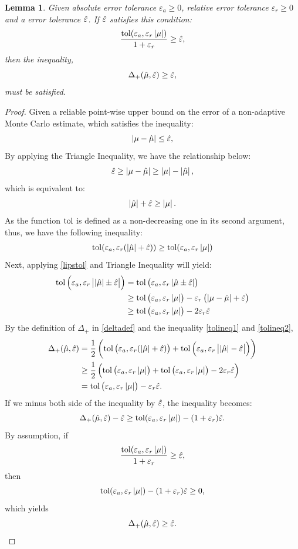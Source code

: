 \documentclass{iitthesis}
\newtheorem{lemma}[theorem]{Lemma}
\begin{document}
\begin{lemma}\label{cost2}
Given absolute error tolerance $\varepsilon_a \geq 0$, relative error tolerance $\varepsilon_r \geq 0$ and a error tolerance $\hat{\varepsilon}$. If $\hat{\varepsilon}$ satisfies this condition: $$\frac{\operatorname{tol}(\varepsilon_a, \varepsilon_r\left \lvert \mu \right \rvert)}{1+\varepsilon_r} \geq \hat{\varepsilon}, $$
then the inequality, $$\Delta_{+}(\hat{\mu},\hat{\varepsilon})\geq \hat{\varepsilon},$$ must be satisfied.
\end{lemma}
\begin{proof}
Given a reliable point-wise upper bound on the error of a non-adaptive Monte Carlo estimate, which satisfies the inequality: $$\left \lvert \mu -\hat{\mu} \right \rvert\leq \hat{\varepsilon},$$ By applying the Triangle Inequality, we have the relationship below:
$$\hat{\varepsilon} \geq \left \lvert \mu -\hat{\mu} \right \rvert\geq \left \lvert \mu \right \rvert-\left \lvert \hat{\mu} \right \rvert,$$ 
which is equivalent to: $$\left \lvert \hat{\mu} \right \rvert+\hat{\varepsilon} \geq \left \lvert \mu \right \rvert.$$
As the function $\operatorname{tol}$ is defined as a non-decreasing one in its second argument, thus, we have the following inequality:
\begin{align}\label{tolineq1}
\operatorname{tol}(\varepsilon_a, \varepsilon_r (\left \lvert \hat{\mu} \right \rvert+\hat{\varepsilon}))  \geq \operatorname{tol}(\varepsilon_a, \varepsilon_r \left \lvert \mu \right \rvert)
\end{align}
Next, applying \eqref{lipstol} and Triangle Inequality will yield:
\begin{align}
\operatorname{tol}\left(\varepsilon_a, \varepsilon_r \left \lvert \left \lvert \hat{\mu} \right \rvert\pm\hat{\varepsilon} \right \rvert\right)  &= \operatorname{tol}\left(\varepsilon_a, \varepsilon_r \left \lvert \hat{\mu} \pm\hat{\varepsilon} \right \rvert\right) \\& 
 \geq \operatorname{tol}\left(\varepsilon_a, \varepsilon_r \left \lvert \mu \right \rvert\right) - \varepsilon_r\left(\left \lvert \mu-\hat{\mu} \right \rvert+\hat{\varepsilon}\right) \\&
 \geq  \operatorname{tol}\left(\varepsilon_a, \varepsilon_r \left \lvert \mu \right \rvert\right) - 2\varepsilon_r\hat{\varepsilon} \label{tolineq2}
\end{align}
By the definition of $\Delta_{+}$ in \eqref{deltadef} and the inequality \eqref{tolineq1} and \eqref{tolineq2},
 \begin{align}
\Delta_{+}(\hat{\mu}, \hat{\varepsilon}) &= \frac{1}{2} \left ( \operatorname{tol}\left(\varepsilon_a, \varepsilon_r (\left \lvert \hat{\mu} \right \rvert+\hat{\varepsilon})\right) +\operatorname{tol}\left(\varepsilon_a, \varepsilon_r \left \lvert \left \lvert \hat{\mu} \right \rvert-\hat{\varepsilon} \right \rvert\right) \right) \\&
\geq \frac{1}{2} \left( \operatorname{tol}\left(\varepsilon_a,\varepsilon_r \left \lvert \mu \right \rvert\right) + \operatorname{tol}\left(\varepsilon_a, \varepsilon_r \left \lvert \mu \right \rvert\right) - 2\varepsilon_r\hat{\varepsilon} \right)\\& =  \operatorname{tol}\left(\varepsilon_a, \varepsilon_r \left \lvert \mu \right \rvert\right) - \varepsilon_r\hat{\varepsilon}.
\end{align}
If we minus both side of the inequality by $\hat{\varepsilon}$, the inequality becomes:
$$\Delta_{+}(\hat{\mu}, \hat{\varepsilon}) -\hat{\varepsilon} \geq \operatorname{tol}(\varepsilon_a,\varepsilon_r \left \lvert \mu \right \rvert)-(1+\varepsilon_r)\hat{\varepsilon}.$$
By assumption, if $$\frac{ \operatorname{tol}(\varepsilon_a,\varepsilon_r \left \lvert \mu \right \rvert)}{1+\varepsilon_r} \geq \hat{\varepsilon},$$ then
$$\operatorname{tol}(\varepsilon_a,\varepsilon_r \left \lvert \mu \right \rvert)-(1+\varepsilon_r)\hat{\varepsilon} \geq 0, $$ 
which yields
$$\Delta_{+}(\hat{\mu}, \hat{\varepsilon}) \geq \hat{\varepsilon}.$$
\end{proof}
\end{document}
